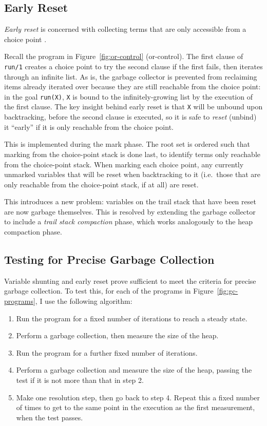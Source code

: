 \subsection{Early Reset}

\label{sec:early-reset}

\emph{Early reset} is concerned with collecting terms that are only accessible from a choice point \cite{applebyGarbargecollectionProlog1988}.

Recall the program in Figure~\ref{fig:or-control} (or-control). The first clause of \texttt{run/1} creates a choice point to try the second clause if the first fails, then iterates through an infinite list. As is, the garbage collector is prevented from reclaiming items already iterated over because they are still reachable from the choice point: in the goal \texttt{run(X)}, \texttt{X} is bound to the infinitely-growing list by the execution of the first clause. The key insight behind early reset is that \texttt{X} will be unbound upon backtracking, before the second clause is executed, so it is safe to \emph{reset} (unbind) it ``early'' if it is only reachable from the choice point.

This is implemented during the mark phase. The root set is ordered such that marking from the choice-point stack is done last, to identify terms only reachable from the choice-point stack. When marking each choice point, any currently unmarked variables that will be reset when backtracking to it (i.e.\ those that are only reachable from the choice-point stack, if at all) are reset.

This introduces a new problem: variables on the trail stack that have been reset are now garbage themselves. This is resolved by extending the garbage collector to include a \emph{trail stack compaction} phase, which works analogously to the heap compaction phase.

\subsection{Testing for Precise Garbage Collection}

\label{sec:gc-testing}

Variable shunting and early reset prove sufficient to meet the criteria for precise garbage collection. To test this, for each of the programs in Figure~\ref{fig:gc-programs}, I use the following algorithm:

\begin{enumerate}
\item Run the program for a fixed number of iterations to reach a steady state.
\item Perform a garbage collection, then measure the size of the heap.
\item Run the program for a further fixed number of iterations.
\item Perform a garbage collection and measure the size of the heap, passing the test if it is not more than that in step 2.
\item Make one resolution step, then go back to step 4. Repeat this a fixed number of times to get to the same point in the execution as the first measurement, when the test passes.
\end{enumerate}

